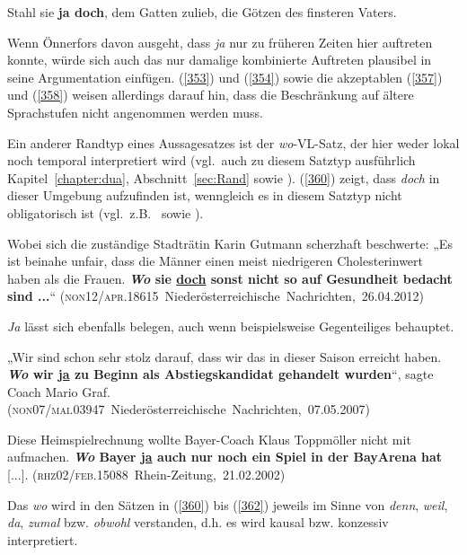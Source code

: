 \begin{exe}
	\ex\label{359} 
	Stahl sie \textbf{ja doch}, dem Gatten zulieb, die Götzen des finsteren Vaters.	   
	\newline
	\hbox{}\hfill\hbox{\citet[187, Anm. 26]{Oppenrieder1987}}	
\end{exe}		
Wenn Önnerfors davon ausgeht, dass \textit{ja }nur zu früheren Zeiten hier auftreten konnte, würde sich auch das nur damalige kombinierte Auftreten plausibel in seine Argumentation einfügen. (\ref{353}) und (\ref{354}) sowie die akzeptablen (\ref{357}) und (\ref{358}) weisen allerdings darauf hin, dass die Beschränkung auf ältere Sprachstufen nicht angenommen werden muss. 

Ein anderer Randtyp eines Aussagesatzes ist  der \textit{wo}-VL-Satz, der hier weder lokal noch temporal interpretiert wird (vgl.\ auch zu diesem Satztyp ausführlich Kapitel~\ref{chapter:dua}, Abschnitt~\ref{sec:Rand} sowie \citealt{MuellerimDruck}). (\ref{360}) zeigt, dass \textit{doch} in dieser Umgebung aufzufinden ist, wenngleich es in diesem Satztyp nicht obligatorisch ist (vgl.\ z.B.\ \citealt[152]{Pasch1999} sowie \citealt[324]{Guenthner2002}).

\begin{exe}
	\ex\label{360} 

	Wobei sich die zuständige Stadträtin Karin Gutmann scherzhaft beschwerte: „Es ist beinahe unfair, dass die Männer einen meist niedrigeren 				Cholesterinwert haben als die Frauen. \textbf{\textit{Wo} sie \underline{doch} sonst nicht so auf Gesundheit bedacht sind ...}“    
	\newline
	\hbox{}\hfill\hbox{(\textsc{non12/apr.18615} Niederösterreichische Nachrichten, 26.04.2012)}	
\end{exe} 	
\textit{Ja} lässt sich ebenfalls belegen, auch wenn beispielsweise \citet[194]{Kwon2005} Gegenteiliges behauptet.

\begin{exe}
	\ex\label{361} 

	„Wir sind schon sehr stolz darauf, dass wir das in dieser Saison erreicht haben. \textbf{\textit{Wo} wir \underline{ja} zu Beginn als Abstiegskandidat gehandelt wurden}“, sagte Coach Mario Graf.    
	\newline
	\hbox{}\hfill\hbox{(\textsc{non07/mai.03947} Niederösterreichische Nachrichten, 07.05.2007)}	
\end{exe}

\begin{exe}
	\ex\label{362} 

	Diese Heimspielrechnung wollte Bayer-Coach Klaus Toppmöller nicht mit aufmachen. \textbf{\textit{Wo} Bayer \underline{ja} auch nur noch ein Spiel in 		der BayArena hat} [...].   
	\hbox{}\hfill\hbox{(\textsc{rhz02/feb.15088} Rhein-Zeitung, 21.02.2002)}	
\end{exe}
Das \textit{wo} wird in den Sätzen in (\ref{360}) bis (\ref{362}) jeweils im Sinne von \textit{denn}, \textit{weil}, \textit{da}, \textit{zumal} bzw. \textit{obwohl} verstanden, d.h. es wird kausal bzw. konzessiv interpretiert.

